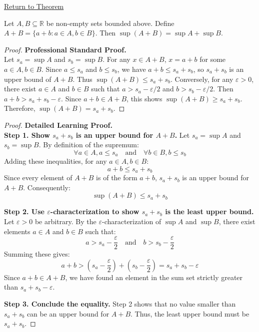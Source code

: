 \newpage
{}
\label{prf:supremum-sum-set}

\begin{remark*}[Return]
\hyperref[thm:supremum-sum-set]{Return to Theorem}
\end{remark*}

\begin{theorem*}
Let $A, B \subseteq \mathbb{R}$ be non-empty sets bounded above. Define $A + B = \{a + b : a \in A, b \in B\}$. Then $\sup(A + B) = \sup A + \sup B$.
\end{theorem*}

\begin{proof}
\textbf{Professional Standard Proof.}~\\
Let $s_a = \sup A$ and $s_b = \sup B$. For any $x \in A+B$, $x = a+b$ for some $a \in A, b \in B$. Since $a \le s_a$ and $b \le s_b$, we have $a+b \le s_a + s_b$, so $s_a + s_b$ is an upper bound of $A+B$. Thus $\sup(A+B) \le s_a + s_b$. Conversely, for any $\varepsilon > 0$, there exist $a \in A$ and $b \in B$ such that $a > s_a - \varepsilon/2$ and $b > s_b - \varepsilon/2$. Then $a+b > s_a + s_b - \varepsilon$. Since $a+b \in A+B$, this shows $\sup(A+B) \ge s_a + s_b$. Therefore, $\sup(A+B) = s_a + s_b$.
\end{proof}

\begin{proof}
\textbf{Detailed Learning Proof.}~\\

\textbf{Step 1. Show $s_a + s_b$ is an upper bound for $A+B$.}
Let $s_a = \sup A$ and $s_b = \sup B$. By definition of the supremum:
\[ \forall a \in A, a \le s_a \quad \text{and} \quad \forall b \in B, b \le s_b \]
Adding these inequalities, for any $a \in A, b \in B$:
\[ a + b \le s_a + s_b \]
Since every element of $A+B$ is of the form $a+b$, $s_a + s_b$ is an upper bound for $A+B$. Consequently:
\[ \sup(A+B) \le s_a + s_b \]

\textbf{Step 2. Use $\varepsilon$-characterization to show $s_a + s_b$ is the least upper bound.}
Let $\varepsilon > 0$ be arbitrary. By the $\varepsilon$-characterization of $\sup A$ and $\sup B$, there exist elements $a \in A$ and $b \in B$ such that:
\[ a > s_a - \frac{\varepsilon}{2} \quad \text{and} \quad b > s_b - \frac{\varepsilon}{2} \]
Summing these gives:
\[ a + b > (s_a - \frac{\varepsilon}{2}) + (s_b - \frac{\varepsilon}{2}) = s_a + s_b - \varepsilon \]
Since $a+b \in A+B$, we have found an element in the sum set strictly greater than $s_a + s_b - \varepsilon$.

\textbf{Step 3. Conclude the equality.}
Step 2 shows that no value smaller than $s_a + s_b$ can be an upper bound for $A+B$. Thus, the least upper bound must be $s_a + s_b$.
\end{proof}

